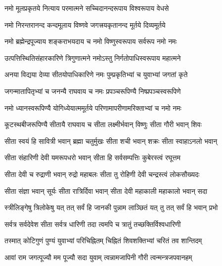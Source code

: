 

\addtocounter{shlokacount}{23}


\twolineshloka
{नमो मूलप्रकृतये नित्याय परमात्मने}
{सच्चिदानन्दरूपाय विश्वरूपाय वेधसे} %

\twolineshloka
{नमो निरन्तरानन्द कन्दमूलाय विष्णवे}
{जगत्त्रयकृतानन्द मूर्तये दिव्यमूर्तये} %

\twolineshloka
{नमो ब्रह्मेन्द्रपूज्याय शङ्कराभयदाय च}
{नमो विष्णुस्वरूपाय सर्वरूप नमो नमः} %

\twolineshloka
{उत्पत्तिस्थितिसंहारकारिणे त्रिगुणात्मने}
{नमोऽस्तु निर्गतोपाधिस्वरूपाय महात्मने} %

\twolineshloka
{अनया विद्यया देव्या सीतयोपाधिकारिणे}
{नमः पुम्प्रकृतिभ्यां च युवाभ्यां जगतां कृते} %

\twolineshloka
{जगन्मातापितृभ्यां च जनन्यै राघवाय च}
{नमः प्रपञ्चरूपिण्यै निष्प्रपञ्चस्वरूपिणे} %

\twolineshloka
{नमो ध्यानस्वरूपिण्यै योगिध्येयात्ममूर्तये}
{परिणामापरीणामरिक्ताभ्यां च नमो नमः} %

\twolineshloka
{कूटस्थबीजरूपिण्यै सीतायै राघवाय च}
{सीता लक्ष्मीर्भवान् विष्णुः सीता गौरी भवान् शिवः} %

\twolineshloka
{सीता स्वयं हि सावित्री भवान् ब्रह्मा चतुर्मुखः}
{सीता शची भवान् शक्रः सीता स्वाहाऽनलो भवान्} %

\twolineshloka
{सीता संहारिणी देवी यमरूपधरो भवान्}
{सीता हि सर्वसम्पत्तिः कुबेरस्त्वं रघूत्तम} %

\twolineshloka
{सीता देवी च रुद्राणी भवान् रुद्रो महाबलः}
{सीता तु रोहिणी देवी चन्द्रस्त्वं लोकसौख्यदः} %

\twolineshloka
{सीता संज्ञा भवान् सूर्यः सीता रात्रिर्दिवा भवान्}
{सीता देवी महाकाली महाकालो भवान् सदा} %

\twolineshloka
{स्त्रीलिङ्गेषु त्रिलोकेषु यत् तत् सर्वं हि जानकी}
{पुन्नाम लाञ्छितं यत् तु तत् सर्वं हि भवान् प्रभो} %

\twolineshloka
{सर्वत्र सर्वदेवेश सीता सर्वत्र धारिणी}
{तदा त्वमपि च त्रातुं तच्छक्तिर्विश्वधारिणी} %

\twolineshloka
{तस्मात् कोटिगुणं पुण्यं युवाभ्यां परिचिह्नितम्}
{चिह्नितं शिवशक्तिभ्यां चरितं तव शान्तिदम्} %

\twolineshloka
{आवां राम जगत्पूज्यौ मम पूज्यौ सदा युवाम्}
{त्वन्नामजापिनी गौरी त्वन्मन्त्रजपवानहम्} %

